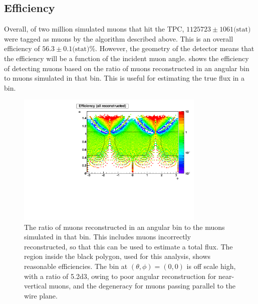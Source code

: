 \documentclass[herrin-thesis.tex]{subfiles}
\begin{document}
\subsection{Efficiency}
Overall, of two million simulated muons that hit the TPC, \(1125723\pm1061\text{(stat)}\) were tagged as muons by the algorithm described above. This is an overall efficiency of \(56.3 \pm 0.1\text{(stat)}\)\%. However, the geometry of the detector means that the efficiency will be a function of the incident muon angle.  shows the efficiency of detecting muons based on the ratio of muons reconstructed in an angular bin to muons simulated in that bin. This is useful for estimating the true flux in a bin.

 \begin{figure}[htb]
 \centering
 \includegraphics[width=0.8\textwidth]{./plots/muon_efficiency.pdf}
 \caption[Efficiency of reconstructing muons as a function of angle]{The ratio of muons reconstructed in an angular bin to the muons simulated in that bin. This includes muons incorrectly reconstructed, so that this can be used to estimate a total flux. The region inside the black polygon, used for this analysis, shows reasonable efficiencies. The bin at \((\theta, \phi) = (0, 0)\) is off scale high, with a ratio of \num{5.2d3}, owing to poor angular reconstruction for near-vertical muons, and the degeneracy for muons passing parallel to the wire plane.}
 \label{fig:muon_efficiency}
 \end{figure}
 
\end{document}
